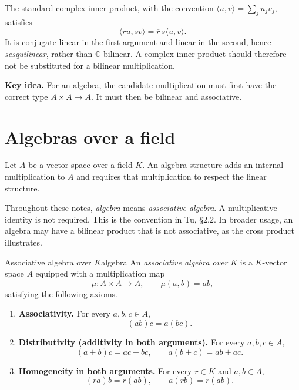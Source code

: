 \documentclass[10pt,a4paper]{article}
\newcommand{\C}{\mathbb{C}}
\newcommand{\keyidea}[1]{%
  \par\smallskip
  \begin{minipage}{\linewidth}
  \noindent\textbf{\color{vuBurgundy}Key idea.} #1
  \end{minipage}
  \par\smallskip
}
\begin{document}
\begin{precision}
The standard complex inner product, with the convention
$\langle u,v\rangle=\sum_j\overline{u_j}v_j$, satisfies
\[
  \langle ru,sv\rangle=\overline r\,s\langle u,v\rangle.
\]
It is conjugate-linear in the first argument and linear in the second, hence
\emph{sesquilinear}, rather than $\C$-bilinear. A complex inner product should
therefore not be substituted for a bilinear multiplication.
\end{precision}

\keyidea{For an algebra, the candidate multiplication must first have the
correct type $A\times A\to A$. It must then be bilinear and associative.}

\section{Algebras over a field}

Let $A$ be a vector space over a field $K$. An algebra structure adds an
internal multiplication to $A$ and requires that multiplication to respect the
linear structure.

Throughout these notes, \emph{algebra} means \emph{associative algebra}. A
multiplicative identity is not required. This is the convention in Tu,
\S2.2. In broader usage, an algebra may have a bilinear product that is not
associative, as the cross product illustrates.

\begin{definition}{Associative algebra over $K$}{algebra}
An \emph{associative algebra over $K$} is a $K$-vector space $A$ equipped with
a multiplication map
\[
  \mu:A\times A\longrightarrow A,
  \qquad
  \mu(a,b)=ab,
\]
satisfying the following axioms.
\begin{enumerate}[label=\textup{(A\arabic*)}]
  \item \textbf{Associativity.} For every $a,b,c\in A$,
  \[
    (ab)c=a(bc).
  \]

  \item \textbf{Distributivity (additivity in both arguments).}
  For every $a,b,c\in A$,
  \[
    (a+b)c=ac+bc,
    \qquad
    a(b+c)=ab+ac.
  \]

  \item \textbf{Homogeneity in both arguments.} For every $r\in K$ and
  $a,b\in A$,
  \[
    (ra)b=r(ab),
    \qquad
    a(rb)=r(ab).
  \]
\end{enumerate}
\end{definition}
\end{document}
